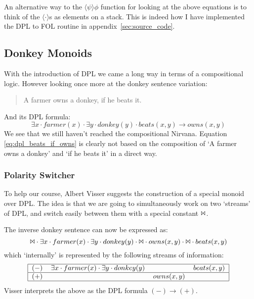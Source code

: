 \documentclass[12pt]{article}
\begin{document}
An alternative way to the $\langle\psi\rangle\phi$ function for looking at the above equations is to think of the $\langle\cdot\rangle$s as elements on a stack. This is indeed how I have implemented the DPL to FOL routine in appendix~\ref{sec:source_code}.

\subsection{Donkey Monoids}
With the introduction of DPL we came a long way in terms of a compositional logic. However looking once more at the donkey sentence variation:
%
\begin{quotation}
A farmer owns a donkey, if he beats it.
\end{quotation}
%
And its DPL formula:
%
\begin{equation}
\exists x \cdot farmer(x) \cdot \exists y \cdot donkey(y) \cdot beats(x,y) \rightarrow owns(x,y)\label{eq:dpl_beats_if_owns}
\end{equation}
%
We see that we still haven't reached the compositional Nirvana. Equation \eqref{eq:dpl_beats_if_owns} is clearly not based on the composition of `A farmer owns a donkey' and `if he beats it' in a direct way.

\subsubsection{Polarity Switcher}
To help our course, Albert Visser suggests the construction of a special monoid over DPL. The idea is that we are going to simultaneously work on two `streams' of DPL, and switch easily between them with a special constant $\Bowtie$.

The inverse donkey sentence can now be expressed as:
%
\begin{equation}
\Bowtie \cdot \exists x \cdot farmer(x) \cdot \exists y \cdot donkey(y) \cdot \Bowtie \cdot owns(x,y) \cdot \Bowtie \cdot beats(x,y)
\end{equation}
%
which `internally' is represented by the following streams of information:
%
\begin{equation}
\begin{tabular}{|clll|}
    \hline
    $(-)$ & $\exists x \cdot farmer(x) \cdot \exists y \cdot donkey(y)$ & ~ & $beats(x,y)$ \\\hline
    $(+)$ & ~ & $owns(x,y)$ & ~ \\\hline
\end{tabular}
\end{equation}
%
Visser interprets the above as the DPL formula $(-) \rightarrow (+)$.
\end{document}
